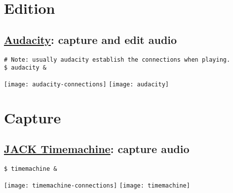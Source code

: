 
\chapter{Edition}

\section{\href{http://audacity.sourceforge.net}{Audacity}: capture and edit audio}

\begin{verbatim}
# Note: usually audacity establish the connections when playing.
$ audacity &
\end{verbatim}
\begin{center}
  \texttt{[image: audacity-connections]}
  \texttt{[image: audacity]}
\end{center}


\chapter{Capture}

\section{\href{http://plugin.org.uk/timemachine/}{JACK Timemachine}: capture audio}

\begin{verbatim}
$ timemachine &
\end{verbatim}
\begin{center}
  \texttt{[image: timemachine-connections]}
  \texttt{[image: timemachine]}
\end{center}

